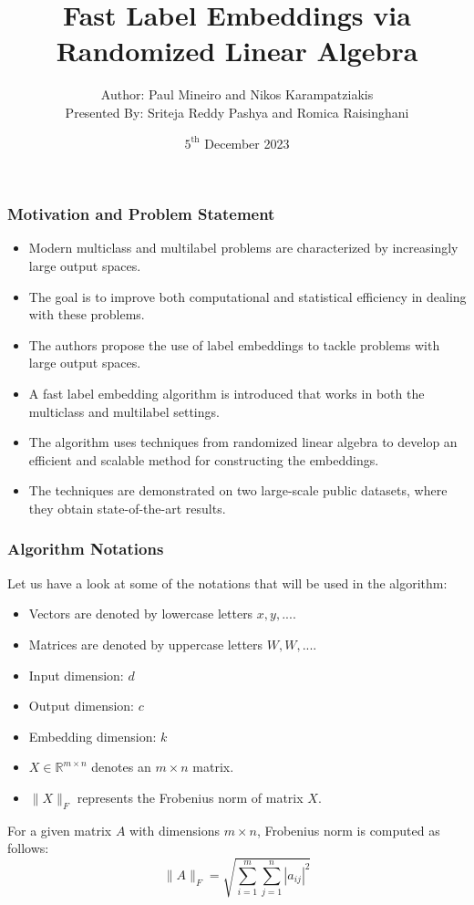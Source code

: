 \documentclass{beamer}
\begin{document}
\title{Fast Label Embeddings via Randomized Linear Algebra}

\author{Author: Paul Mineiro and Nikos Karampatziakis \\ Presented By: Sriteja Reddy Pashya and Romica Raisinghani}


\date{$5^\text{th}$ December 2023}
\frame{\titlepage}


\begin{frame}
\frametitle{Motivation and Problem Statement}
\begin{itemize}
    \item Modern multiclass and multilabel problems are characterized by increasingly large output spaces.
    \item The goal is to improve both computational and statistical efficiency in dealing with these problems.
    \item The authors propose the use of label embeddings to tackle problems with large output spaces.
    \item A fast label embedding algorithm is introduced that works in both the multiclass and multilabel settings.
    \item The algorithm uses techniques from randomized linear algebra to develop an efficient and scalable method for constructing the embeddings.
    \item The techniques are demonstrated on two large-scale public datasets, where they obtain state-of-the-art results.
\end{itemize}
\end{frame}


\begin{frame}
\frametitle{Algorithm Notations}
Let us have a look at some of the notations that will be used in the algorithm:
\begin{itemize}
    \item Vectors are denoted by lowercase letters $ x, y, . . .$.
    \item Matrices are denoted by uppercase letters $ W, W, . . .$.
    \item Input dimension: $d$
    \item Output dimension: $c$
    \item Embedding dimension: $k$
    \item $ X \in \mathbb{R}^{m \times n}$ denotes an $m \times n$ matrix.
    \item \(\|X\|_F\) represents the Frobenius norm of matrix $X$.
\end{itemize}
For a given matrix $A$ with dimensions $m \times n$, Frobenius norm is computed as follows:
\begin{equation*}
    \|A\|_F = \sqrt{\sum_{i=1}^m \sum_{j=1}^n |a_{ij}|^2}
\end{equation*}
\end{frame}
\end{document}
